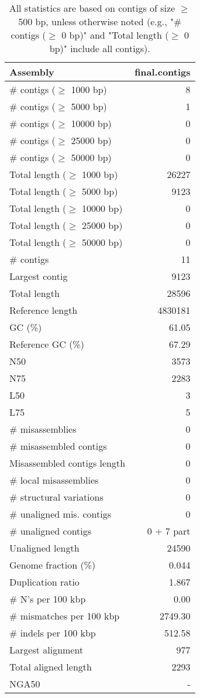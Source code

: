 \documentclass[12pt,a4paper]{article}
\begin{document}
\begin{table}[ht]
\begin{center}
\caption{All statistics are based on contigs of size $\geq$ 500 bp, unless otherwise noted (e.g., "\# contigs ($\geq$ 0 bp)" and "Total length ($\geq$ 0 bp)" include all contigs).}
\begin{tabular}{|l*{1}{|r}|}
\hline
Assembly & final.contigs \\ \hline
\# contigs ($\geq$ 1000 bp) & 8 \\ \hline
\# contigs ($\geq$ 5000 bp) & 1 \\ \hline
\# contigs ($\geq$ 10000 bp) & 0 \\ \hline
\# contigs ($\geq$ 25000 bp) & 0 \\ \hline
\# contigs ($\geq$ 50000 bp) & 0 \\ \hline
Total length ($\geq$ 1000 bp) & 26227 \\ \hline
Total length ($\geq$ 5000 bp) & 9123 \\ \hline
Total length ($\geq$ 10000 bp) & 0 \\ \hline
Total length ($\geq$ 25000 bp) & 0 \\ \hline
Total length ($\geq$ 50000 bp) & 0 \\ \hline
\# contigs & 11 \\ \hline
Largest contig & 9123 \\ \hline
Total length & 28596 \\ \hline
Reference length & 4830181 \\ \hline
GC (\%) & 61.05 \\ \hline
Reference GC (\%) & 67.29 \\ \hline
N50 & 3573 \\ \hline
N75 & 2283 \\ \hline
L50 & 3 \\ \hline
L75 & 5 \\ \hline
\# misassemblies & 0 \\ \hline
\# misassembled contigs & 0 \\ \hline
Misassembled contigs length & 0 \\ \hline
\# local misassemblies & 0 \\ \hline
\# structural variations & 0 \\ \hline
\# unaligned mis. contigs & 0 \\ \hline
\# unaligned contigs & 0 + 7 part \\ \hline
Unaligned length & 24590 \\ \hline
Genome fraction (\%) & 0.044 \\ \hline
Duplication ratio & 1.867 \\ \hline
\# N's per 100 kbp & 0.00 \\ \hline
\# mismatches per 100 kbp & 2749.30 \\ \hline
\# indels per 100 kbp & 512.58 \\ \hline
Largest alignment & 977 \\ \hline
Total aligned length & 2293 \\ \hline
NGA50 & - \\ \hline
\end{tabular}
\end{center}
\end{table}
\end{document}
